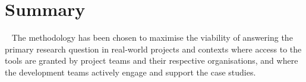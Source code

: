 




\section[Summary of the methodology chapter]{Summary}~\label{methodology-summary-section}
The methodology has been chosen to maximise the viability of answering the primary research question in real-world projects and contexts where access to the tools are granted by project teams and their respective organisations, and where the development teams actively engage and support the case studies.

